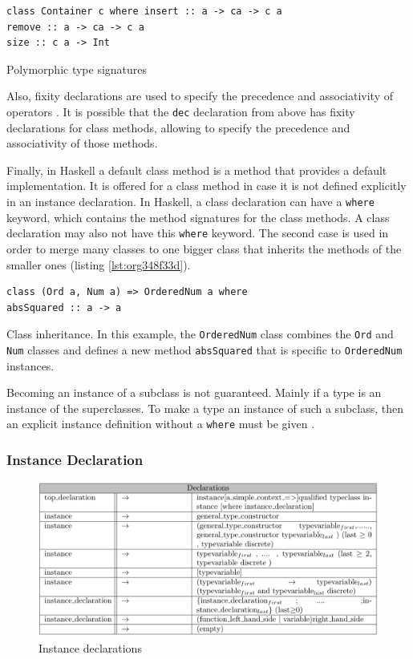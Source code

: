 \documentclass[a4paper, titlepage, twoside]{article}
\begin{document}
\begin{listing}[htbp]
\begin{verbatim}
class Container c where insert :: a -> ca -> c a
remove :: a -> ca -> c a
size :: c a -> Int
\end{verbatim}
\caption{\label{lst:org9c0a834}Polymorphic type signatures}
\end{listing}

Also, fixity declarations are used to specify the precedence and associativity of operators \autocite{marlowHaskell2010Language2010}. It is possible that the \texttt{dec} declaration from above has fixity declarations for class methods, allowing to specify the precedence and associativity of those methods.

Finally, in Haskell a default class method is a method that provides a default implementation. It is offered for a class method in case it is not defined explicitly in an instance declaration. In Haskell, a class declaration can have a \texttt{where} keyword, which contains the method signatures for the class methods. A class declaration may also not have this \texttt{where} keyword. The second case is used in order to merge many classes to one bigger class that inherits the methods of the smaller ones (listing \ref{lst:org348f33d}).

\begin{listing}[htbp]
\begin{verbatim}
class (Ord a, Num a) => OrderedNum a where
absSquared :: a -> a
\end{verbatim}
\caption[Class inheritance]{\label{lst:org348f33d}Class inheritance. In this example, the \texttt{OrderedNum} class combines the \texttt{Ord} and \texttt{Num} classes and defines a new method \texttt{absSquared} that is specific to \texttt{OrderedNum} instances.}
\end{listing}

Becoming an instance of a subclass is not guaranteed. Mainly if a type is an instance of the superclasses. To make a type an instance of such a subclass, then an explicit instance definition without a \texttt{where} must be given \autocite{marlowHaskell2010Language2010}.

\subsubsection{Instance Declaration}
\label{sec:org8cf3258}

\begin{figure}[htbp]
\centering
\includegraphics[width=.9\linewidth]{img/2023-05-25_18-46-02_screenshot.png}
\caption{Instance declarations}
\end{figure}
\end{document}
